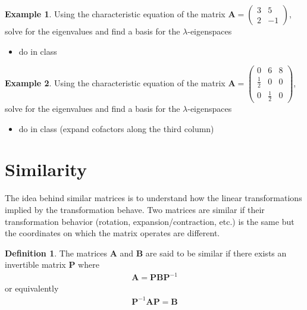 \documentclass[
]{book}
\providecommand{\tightlist}{%
  \setlength{\itemsep}{0pt}\setlength{\parskip}{0pt}}
\theoremstyle{definition}
\newtheorem{definition}{Definition}[chapter]
\theoremstyle{definition}
\newtheorem{example}{Example}[chapter]
\theoremstyle{definition}
\theoremstyle{definition}
\theoremstyle{remark}
\begin{document}
\begin{example}

Using the characteristic equation of the matrix \(\mathbf{A} = \begin{pmatrix} 3 & 5 \\ 2 & -1 \end{pmatrix}\), solve for the eigenvalues and find a basis for the \(\lambda\)-eigenspaces

\begin{itemize}
\tightlist
\item
  do in class
\end{itemize}

\end{example}

\begin{example}

Using the characteristic equation of the matrix \(\mathbf{A} = \begin{pmatrix} 0 & 6 & 8 \\ \frac{1}{2} & 0 & 0 \\ 0 & \frac{1}{2} & 0 \end{pmatrix}\), solve for the eigenvalues and find a basis for the \(\lambda\)-eigenspaces

\begin{itemize}
\tightlist
\item
  do in class (expand cofactors along the third column)
\end{itemize}

\end{example}

\hypertarget{similarity}{%
\section{Similarity}\label{similarity}}

The idea behind similar matrices is to understand how the linear transformations implied by the transformation behave. Two matrices are similar if their transformation behavior (rotation, expansion/contraction, etc.) is the same but the coordinates on which the matrix operates are different.

\begin{definition}
The matrices \(\mathbf{A}\) and \(\mathbf{B}\) are said to be similar if there exists an invertible matrix \(\mathbf{P}\) where
\[
\begin{aligned}
\mathbf{A} = \mathbf{P} \mathbf{B} \mathbf{P}^{-1}
\end{aligned}
\]
or equivalently
\[
\begin{aligned}
\mathbf{P}^{-1} \mathbf{A} \mathbf{P}=  \mathbf{B} 
\end{aligned}
\]
\end{definition}
\end{document}
